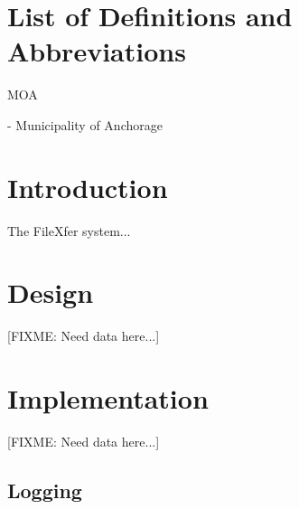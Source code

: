 \documentclass[12pt,letterpaper,dvips]{article}
\newcommand{\FIXME}[1]{\textsf{[FIXME: #1]}}
\newenvironment{itemize*}%
  {\begin{itemize}%
    \setlength{\itemsep}{0pt}%
    \setlength{\parsep}{0pt}}%
  {\end{itemize}}
\begin{document}
\newpage
\tableofcontents

\newpage
\listoffigures
\listoftables


\newpage
\setcounter{secnumdepth}{0}
\section{List of Definitions and Abbreviations}
\begin{itemize*}
  \item{\begin{bf}MOA\end{bf}} - Municipality of Anchorage

\end{itemize*}


\newpage
\setcounter{secnumdepth}{2}
\section{Introduction}
The FileXfer system...

\newpage
\section{Design}
\FIXME{Need data here...}


\newpage
\section{Implementation}
\FIXME{Need data here...}

\subsection{Logging}


\end{document}

